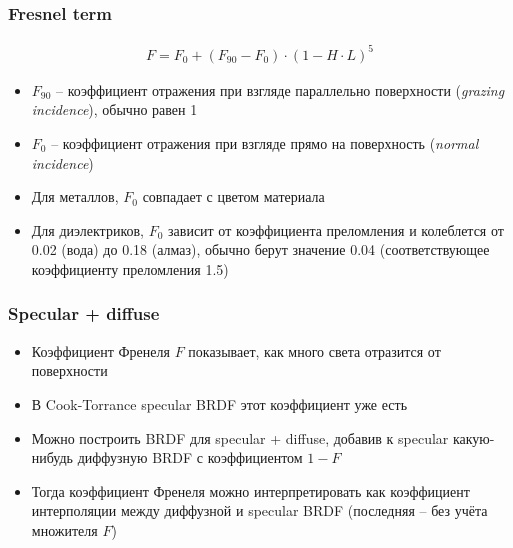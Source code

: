 \documentclass[10pt]{beamer}
\begin{document}
\begin{frame}
\frametitle{Fresnel term}
\begin{gather*}
F = F_0 + (F_{90} - F_0) \cdot (1 - H\cdot L)^5
\end{gather*}
\pause
\begin{itemize}
\item \begin{math}F_{90}\end{math} -- коэффициент отражения при взгляде параллельно поверхности (\textit{grazing incidence}), обычно равен 1
\pause
\item \begin{math}F_0\end{math} -- коэффициент отражения при взгляде прямо на поверхность (\textit{normal incidence})
\pause
\item Для металлов, \begin{math}F_0\end{math} совпадает с цветом материала
\pause
\item Для диэлектриков, \begin{math}F_0\end{math} зависит от коэффициента преломления и колеблется от 0.02 (вода) до 0.18 (алмаз), обычно берут значение 0.04 (соответствующее коэффициенту преломления 1.5)
\end{itemize}
\end{frame}

\begin{frame}
\frametitle{Specular + diffuse}
\begin{itemize}
\item Коэффициент Френеля \begin{math}F\end{math} показывает, как много света отразится от поверхности
\pause
\item В Cook-Torrance specular BRDF этот коэффициент уже есть
\pause
\item Можно построить BRDF для specular + diffuse, добавив к specular какую-нибудь диффузную BRDF с коэффициентом \begin{math}1-F\end{math}
\pause
\item Тогда коэффициент Френеля можно интерпретировать как коэффициент интерполяции между диффузной и specular BRDF (последняя -- без учёта множителя \begin{math}F\end{math})
\end{itemize}
\end{frame}
\end{document}
